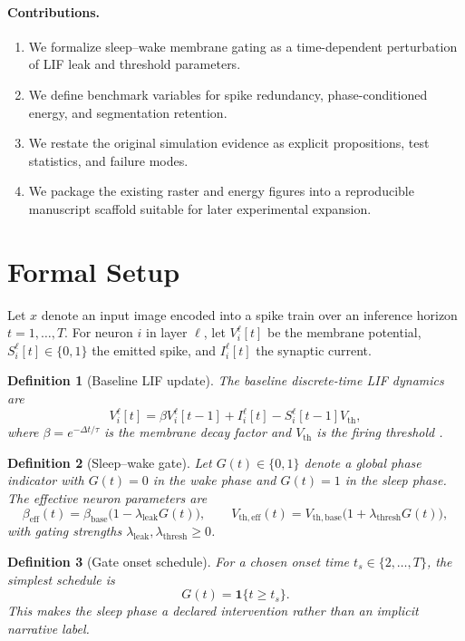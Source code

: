 \documentclass[11pt]{article}
\newtheorem{definition}{Definition}
\begin{document}
\paragraph{Contributions.}
\begin{enumerate}[leftmargin=*]
\item We formalize sleep--wake membrane gating as a time-dependent perturbation of LIF leak and threshold parameters.
\item We define benchmark variables for spike redundancy, phase-conditioned energy, and segmentation retention.
\item We restate the original simulation evidence as explicit propositions, test statistics, and failure modes.
\item We package the existing raster and energy figures into a reproducible manuscript scaffold suitable for later experimental expansion.
\end{enumerate}

\section{Formal Setup}
Let $x$ denote an input image encoded into a spike train over an inference horizon $t=1,\dots,T$. For neuron $i$ in layer $\ell$, let $V_i^\ell[t]$ be the membrane potential, $S_i^\ell[t]\in\{0,1\}$ the emitted spike, and $I_i^\ell[t]$ the synaptic current.

\begin{definition}[Baseline LIF update]
The baseline discrete-time LIF dynamics are
\[
V_i^\ell[t]=\beta V_i^\ell[t-1]+I_i^\ell[t]-S_i^\ell[t-1]V_{\mathrm{th}},
\]
where $\beta=e^{-\Delta t/\tau}$ is the membrane decay factor and $V_{\mathrm{th}}$ is the firing threshold \citep{izhikevich2003simple}.
\end{definition}

\begin{definition}[Sleep--wake gate]
Let $G(t)\in\{0,1\}$ denote a global phase indicator with $G(t)=0$ in the wake phase and $G(t)=1$ in the sleep phase. The effective neuron parameters are
\[
\beta_{\mathrm{eff}}(t)=\beta_{\mathrm{base}}\bigl(1-\lambda_{\mathrm{leak}}G(t)\bigr),
\qquad
V_{\mathrm{th,eff}}(t)=V_{\mathrm{th,base}}\bigl(1+\lambda_{\mathrm{thresh}}G(t)\bigr),
\]
with gating strengths $\lambda_{\mathrm{leak}},\lambda_{\mathrm{thresh}}\ge 0$.
\end{definition}

\begin{definition}[Gate onset schedule]
For a chosen onset time $t_s\in\{2,\dots,T\}$, the simplest schedule is
\[
G(t)=\mathbf{1}\{t\ge t_s\}.
\]
This makes the sleep phase a declared intervention rather than an implicit narrative label.
\end{definition}
\end{document}
